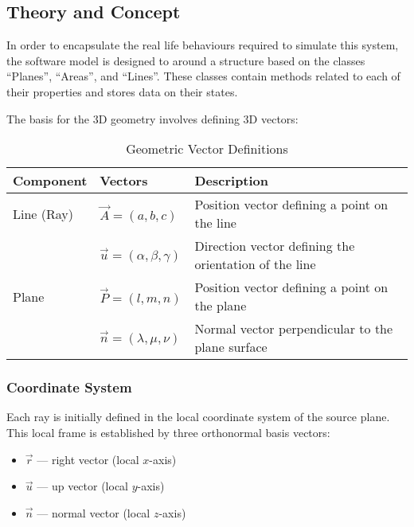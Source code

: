 \subsection{Theory and Concept}
In order to encapsulate the real life behaviours required to simulate this system, the software model is designed to around a structure based on the classes “Planes”, “Areas”, and “Lines”. These classes contain methods related to each of their properties and stores data on their states.    

The basis for the 3D geometry involves defining 3D vectors:

\begin{table}[h]
    \centering
    \caption{Geometric Vector Definitions}
    \label{tab:ray_projection_geometry}
    \begin{tabular}{>{\raggedright\arraybackslash}p{2.5cm}>{\centering\arraybackslash}p{3cm}>{\raggedright\arraybackslash}p{6cm}}
    \toprule
    \textbf{Component} & \textbf{Vectors} & \textbf{Description} \\
    \midrule
    Line (Ray) & $\vec{A} = (a,b,c)$ & Position vector defining a point on the line \\
     & $\vec{u} = (\alpha, \beta, \gamma)$ & Direction vector defining the orientation of the line \\
    \midrule
    Plane & $\vec{P} = (l,m,n)$ & Position vector defining a point on the plane \\
     & $\vec{n} = (\lambda, \mu, \nu)$ & Normal vector perpendicular to the plane surface \\
    \bottomrule
    \end{tabular}
    \end{table}

\subsubsection{Coordinate System}

Each ray is initially defined in the local coordinate system of the source plane. This local frame is established by three orthonormal basis vectors:

\begin{itemize}
    \item $\vec{r}$ — right vector (local $x$-axis)
    \item $\vec{u}$ — up vector (local $y$-axis)
    \item $\vec{n}$ — normal vector (local $z$-axis)
\end{itemize}

